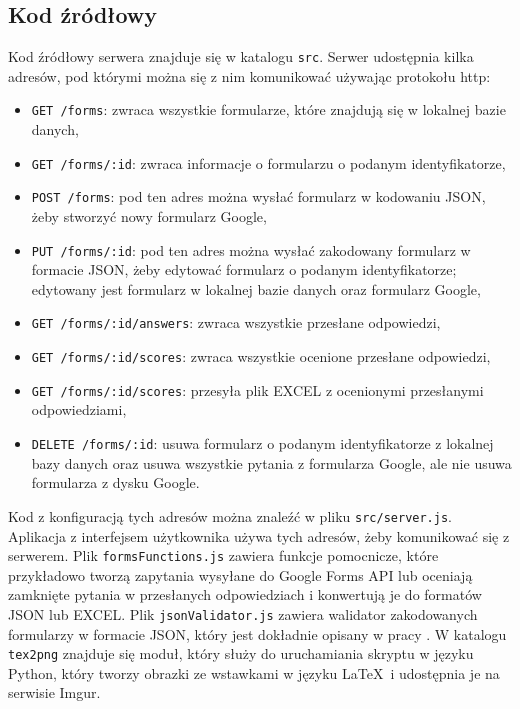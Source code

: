 \subsection{Kod źródłowy}
Kod źródłowy serwera znajduje się w katalogu \texttt{src}. Serwer udostępnia kilka adresów,
pod którymi można się z nim komunikować używając protokołu http:
\begin{itemize}
  \item \texttt{GET /forms}: zwraca wszystkie formularze, które znajdują się w lokalnej
    bazie danych,
  \item \texttt{GET /forms/:id}: zwraca informacje o formularzu o podanym identyfikatorze,
  \item \texttt{POST /forms}: pod ten adres można wysłać formularz w kodowaniu JSON, żeby
    stworzyć nowy formularz Google,
  \item \texttt{PUT /forms/:id}: pod ten adres można wysłać zakodowany formularz w formacie
    JSON, żeby edytować formularz o podanym identyfikatorze; edytowany jest formularz
    w lokalnej bazie danych oraz formularz Google,
  \item \texttt{GET /forms/:id/answers}: zwraca wszystkie przesłane odpowiedzi,
  \item \texttt{GET /forms/:id/scores}: zwraca wszystkie ocenione przesłane odpowiedzi,
  \item \texttt{GET /forms/:id/scores}: przesyła plik EXCEL z ocenionymi przesłanymi 
    odpowiedziami,
  \item \texttt{DELETE /forms/:id}: usuwa formularz o podanym identyfikatorze z lokalnej bazy
    danych oraz usuwa wszystkie pytania z formularza Google, ale nie usuwa formularza z
    dysku Google.
\end{itemize}
Kod z konfiguracją tych adresów można znaleźć w pliku \texttt{src/server.js}. Aplikacja
z interfejsem użytkownika używa tych adresów, żeby komunikować się z serwerem.
Plik \texttt{formsFunctions.js} zawiera funkcje pomocnicze, które przykładowo tworzą
zapytania wysyłane do Google Forms API lub oceniają zamknięte pytania w przesłanych
odpowiedziach i konwertują je do formatów JSON lub EXCEL. Plik \texttt{jsonValidator.js}
zawiera walidator zakodowanych formularzy w formacie JSON, który jest dokładnie opisany
w pracy \ap. W katalogu \texttt{tex2png} znajduje się moduł, który służy do uruchamiania
skryptu w języku Python, który tworzy obrazki ze wstawkami w języku \LaTeX\ i udostępnia
je na serwisie Imgur.

